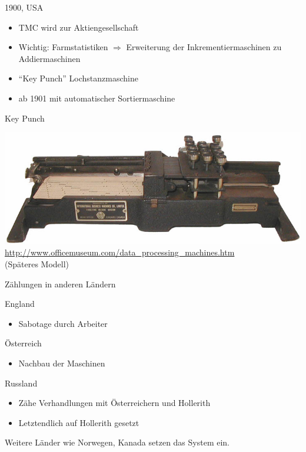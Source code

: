 \documentclass[EU2]{beamer}
\begin{document}
\begin{frame}{1900, USA}
  \begin{itemize}
    \item TMC wird zur Aktiengesellschaft
    \item Wichtig: Farmstatistiken $\Rightarrow$ Erweiterung der
      Inkrementiermaschinen zu Addiermaschinen
    \item \enquote{Key Punch} Lochstanzmaschine
    \item ab 1901 mit automatischer Sortiermaschine
  \end{itemize}
\end{frame}

\begin{frame}[plain]{Key Punch}
  \begin{center}
    \includegraphics[width=1.09\textwidth]{keypunch}\\
    {\tiny \url{http://www.officemuseum.com/data_processing_machines.htm}}\\
    (Späteres Modell)\\
  \end{center}
\end{frame}

\begin{frame}{Zählungen in anderen Ländern}
  \begin{block}{England}
    \begin{itemize}
      \item Sabotage durch Arbeiter
    \end{itemize}
  \end{block}
  \begin{block}{Österreich}
    \begin{itemize}
      \item Nachbau der Maschinen
    \end{itemize}
  \end{block}
  \begin{block}{Russland}
    \begin{itemize}
      \item Zähe Verhandlungen mit Österreichern und Hollerith
      \item Letztendlich auf Hollerith gesetzt
    \end{itemize}
  \end{block}
  Weitere Länder wie Norwegen, Kanada setzen das System ein.
\end{frame}
\end{document}
